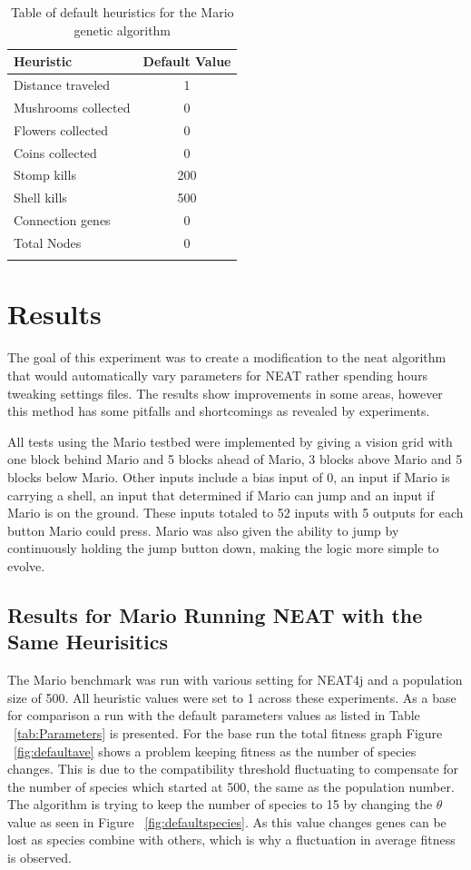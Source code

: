 \documentclass[12pt]{ucthesis} \newif\ifpdf \ifx\pdfoutput\undefined
\begin{document}
\begin{longtable}{| l | c |}
  \hline
  Heuristic & Default Value \\ \hline                   
  Distance traveled & 1  \\ \hline
  Mushrooms collected & 0 \\ \hline
  Flowers collected & 0  \\ \hline
  Coins collected & 0  \\ \hline
  Stomp kills & 200  \\ \hline
  Shell kills  & 500  \\ \hline
  Connection genes  & 0  \\ \hline
  Total Nodes  & 0  \\ \hline

\caption{Table of default heuristics for the Mario genetic
 algorithm}
\label{tab:Heuristics} 
\end{longtable}

\chapter{Results}
\label{chp:Results}

The goal of this experiment was to create a modification to the neat algorithm
that would automatically vary parameters for NEAT rather spending hours
tweaking settings files. The results show improvements in some areas, however
this method has some pitfalls and shortcomings as revealed by experiments.

All tests using the Mario testbed were implemented by giving a vision grid with
one block behind Mario and 5 blocks ahead of Mario, 3 blocks above Mario and 5
blocks below Mario. Other inputs include a bias input of 0, an input if Mario is
carrying a shell, an input that determined if Mario can jump and an input if
Mario is on the ground. These inputs totaled to 52 inputs with 5 outputs for each button Mario
could press. Mario was also given the ability to jump by continuously holding
the jump button down, making the logic more simple to evolve.

\section{Results for Mario Running NEAT with the Same Heurisitics}
The Mario benchmark was run with various setting for NEAT4j and a population
size of 500. All heuristic values were set to 1 across these experiments. As
a base for comparison a run with the default parameters values as listed in
Table ~\ref{tab:Parameters} is presented. For the base run the total fitness graph
Figure ~\ref{fig:defaultave} shows a problem keeping fitness as the number of species
changes. This is due to the compatibility threshold fluctuating to compensate
for the number of species which started at 500, the same as the population
number. The algorithm is trying to keep the number of species to 15 by
changing the $\theta$ value as seen in Figure ~\ref{fig:defaultspecies}. As this value
changes genes can be lost as species combine with others, which is why a
fluctuation in average fitness is observed.
\end{document}
